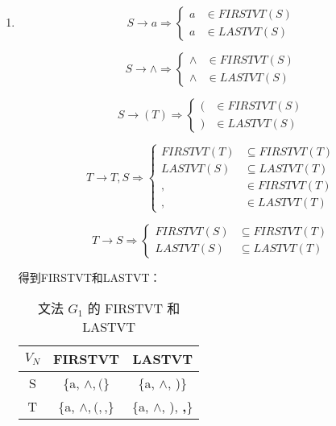 \begin{enumerate}
\begin{enumerate}
        \item
        $$
            S \to a \Rightarrow \left\{
                \begin{array}{rl}
                    a & \in FIRSTVT(S) \\
                    a & \in LASTVT(S) 
                \end{array}
            \right.
        $$
        
        $$
            S \to \wedge \Rightarrow \left\{
                \begin{array}{rl}
                    \wedge & \in FIRSTVT(S)  \\
                    \wedge & \in LASTVT(S)
                \end{array}
            \right.
        $$
        
        $$
            S \to (T) \Rightarrow \left\{
                \begin{array}{rl}
                    ( & \in FIRSTVT(S) \\
                    ) & \in LASTVT(S)
                \end{array}
            \right.
        $$
        
        $$
            T \to T, S \Rightarrow \left\{
                \begin{array}{rl}
                    FIRSTVT(T) & \subseteq FIRSTVT(T) \\
                    LASTVT(S) & \subseteq LASTVT(T) \\
                    , & \in FIRSTVT(T) \\
                    , & \in LASTVT(T)
                \end{array}
            \right.
        $$
        
        $$
            T \to S \Rightarrow \left\{
                \begin{array}{rl}
                    FIRSTVT(S) & \subseteq FIRSTVT(T) \\
                    LASTVT(S) & \subseteq LASTVT(T) 
                \end{array}
            \right.
        $$
        
        得到FIRSTVT和LASTVT：
        
        \begin{table}[H]
            \centering
            \begin{tabular}{|c|c|c|}
                \hline
                $V_N$ & FIRSTVT & LASTVT \\
                \hline
                S & \{a, $\wedge, ($\} & \{a, $\wedge$, )\} \\
                \hline
                T & \{a, $\wedge, (, \textbf{,}$\} & \{a, $\wedge$, ), \textbf{,}\} \\
                \hline
            \end{tabular}
            \caption{文法 $G_1$ 的 FIRSTVT 和 LASTVT}
            \label{tab:G1FL}
        \end{table}
        

\end{enumerate}
\end{enumerate}
